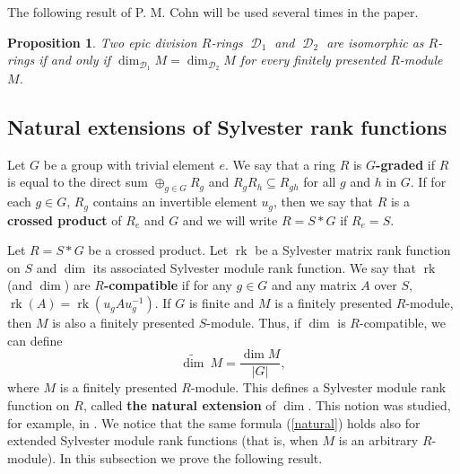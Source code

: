 \documentclass[11pt]{amsart}
\newtheorem{pro}[lem]{Proposition}
\numberwithin{claimcounter}{lem}
\DeclareMathOperator{\D}{\mathcal D}
\DeclareMathOperator{\rk}{rk}
\begin{document}
The following result of   P. M. Cohn will be  used several times in the paper.
\begin{pro}\cite[Theorem 4.4.1]{Cohfields} \label{cohndiv} Two epic division $R$-rings $\D_1$ and $\D_2$ are isomorphic as $R$-rings if and only if $\dim_{\D_1}M=\dim_{\D_2}M$ for every finitely presented $R$-module $M$. \end{pro}

\subsection{Natural extensions of Sylvester rank functions}
Let $G$ be a group with trivial element $e$. We say that a ring $R$ is {\bf $G$-graded} if $R$ is equal to the direct sum $\oplus_{g\in G} R_g$ and $R_gR_h\subseteq R_{gh}$ for all $g$ and $h$  in $G$.  If for each $g\in G$, $R_g$ contains an invertible element $u_g$, then we say that $R$ is a {\bf crossed product} of $R_e$ and $G$ and we will write $R=S*G$ if $R_e= S$. 

Let $R=S*G$ be a crossed product. Let $\rk$ be a Sylvester matrix rank function on   $S$ and $\dim$ its associated   Sylvester module rank function. We say that $\rk$ (and $\dim$)  are {\bf $R$-compatible} if for any $g\in G$ and any matrix $A$ over $S$, $\rk(A)=\rk(u_gAu_g^{-1})$.  If $G$ is finite and $M$ is a finitely presented $R$-module, then $M$ is also  a finitely presented  $S$-module. Thus, if  $\dim$ is $R$-compatible,  we can define
\begin{equation}\label{natural}
\widetilde{\dim }\ M=\frac{ \dim M}{|G|},\end{equation}  where   $M$ is a finitely presented  $R$-module.
This defines a   Sylvester module rank function on $R$, called {\bf the natural extension} of $\dim$. This notion was  studied, for example, in  \cite{JL21}.  We notice that the same formula (\ref{natural}) holds also for extended Sylvester module rank functions (that is, when $M$ is an arbitrary $R$-module).
In this subsection we prove the following result.
\end{document}
